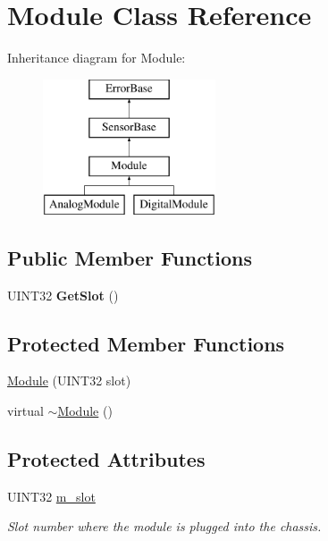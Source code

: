 \hypertarget{classModule}{\section{\-Module \-Class \-Reference}
\label{classModule}
}
\-Inheritance diagram for \-Module\-:\begin{figure}[H]
\begin{center}
\leavevmode
\includegraphics[height=4.000000cm]{classModule}
\end{center}
\end{figure}
\subsection*{\-Public \-Member \-Functions}
\begin{DoxyCompactItemize}
\item 
\hypertarget{classModule_a694b4d2edcb697f3b618f6a261d9a444}{\-U\-I\-N\-T32 {\bfseries \-Get\-Slot} ()}\label{classModule_a694b4d2edcb697f3b618f6a261d9a444}

\end{DoxyCompactItemize}
\subsection*{\-Protected \-Member \-Functions}
\begin{DoxyCompactItemize}
\item 
\hyperlink{classModule_a085618a4166d62b8e169a33b3c4c0f41}{\-Module} (\-U\-I\-N\-T32 slot)
\item 
virtual \hyperlink{classModule_a7c9d9c096786d127590fdd8aa2b7d681}{$\sim$\-Module} ()
\end{DoxyCompactItemize}
\subsection*{\-Protected \-Attributes}
\begin{DoxyCompactItemize}
\item 
\hypertarget{classModule_a360f6185a865566b92e9574e9f51ef94}{\-U\-I\-N\-T32 \hyperlink{classModule_a360f6185a865566b92e9574e9f51ef94}{m\-\_\-slot}}\label{classModule_a360f6185a865566b92e9574e9f51ef94}

\begin{DoxyCompactList}\small\item\em \-Slot number where the module is plugged into the chassis. \end{DoxyCompactList}\end{DoxyCompactItemize}
